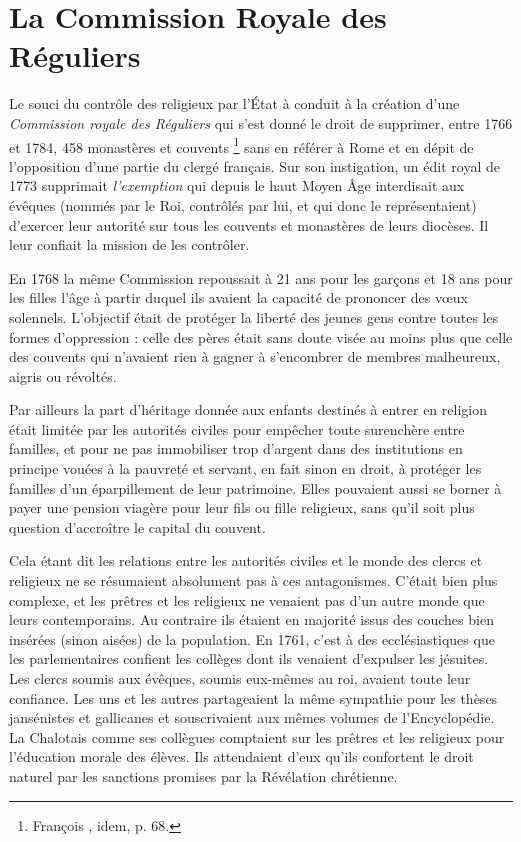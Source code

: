 \section{La Commission Royale des Réguliers}


 Le souci du contrôle des religieux par l'État à conduit à la création d'une \emph{Commission royale des Réguliers} qui s'est donné le droit de supprimer, entre 1766 et 1784, 458 monastères et couvents%
\footnote{François , idem, p. 68.} 
sans en référer à Rome et en dépit de l'opposition d'une partie du clergé français. Sur son instigation, un édit royal de 1773 supprimait \emph{l'exemption} qui depuis le haut Moyen Âge interdisait aux évêques (nommés par le Roi, contrôlés par lui, et qui donc le représentaient) d'exercer leur autorité sur tous les couvents et monastères de leurs diocèses. Il leur confiait la mission de les contrôler. 

 En 1768 la même Commission repoussait à 21 ans pour les garçons et 18 ans pour les filles l'âge à partir duquel ils avaient la capacité de prononcer des vœux solennels. L'objectif était de protéger la liberté des jeunes gens contre toutes les formes d'oppression : celle des pères était sans doute visée au moins plus que celle des couvents qui n'avaient rien à gagner à s'encombrer de membres malheureux, aigris ou révoltés.

 Par ailleurs la part d'héritage donnée aux enfants destinés à entrer en religion était limitée par les autorités civiles pour empêcher toute surenchère entre familles, et pour ne pas immobiliser trop d'argent dans des institutions en principe vouées à la pauvreté et servant, en fait sinon en droit, à protéger les familles d'un éparpillement de leur patrimoine. Elles pouvaient aussi se borner à payer une pension viagère pour leur fils ou fille religieux, sans qu'il soit plus question d'accroître le capital du couvent.

 Cela étant dit les relations entre les autorités civiles et le monde des clercs et religieux ne se résumaient absolument pas à ces antagonismes. C'était bien plus complexe, et les prêtres et les religieux ne venaient pas d'un autre monde que leurs contemporains. Au contraire ils étaient en majorité issus des couches bien insérées (sinon aisées) de la population. En 1761, c'est à des ecclésiastiques que les parlementaires confient les collèges dont ils venaient d'expulser les jésuites. Les clercs soumis aux évêques, soumis eux-mêmes au roi, avaient toute leur confiance. Les uns et les autres partageaient la même sympathie pour les thèses jansénistes et gallicanes et souscrivaient aux mêmes volumes de l'Encyclopédie. La Chalotais comme ses collègues comptaient sur les prêtres et les religieux pour l'éducation morale des élèves. Ils attendaient d'eux qu'ils confortent le droit naturel par les sanctions promises par la Révélation chrétienne. 
 
